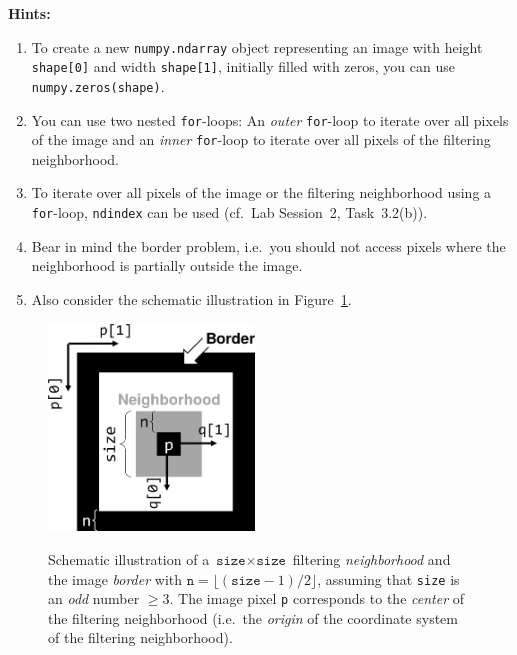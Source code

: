 \documentclass[12pt,a4paper]{article}
\begin{document}
\noindent\textbf{Hints:}
\begin{enumerate}
    \item To create a new \texttt{numpy.ndarray} object representing an image with height \texttt{shape[0]} and width \texttt{shape[1]}, initially filled with zeros, you can use \texttt{numpy.zeros(shape)}.
    \item You can use two nested \texttt{for}-loops: An \emph{outer} \texttt{for}-loop to iterate over all pixels of the image and an \emph{inner} \texttt{for}-loop to iterate over all pixels of the filtering neighborhood.
    \item To iterate over all pixels of the image or the filtering neighborhood using a \texttt{for}-loop, \texttt{ndindex} can be used (cf.\ Lab Session~2, Task~3.2(b)).
    \item Bear in mind the border problem, i.e.\ you should not access pixels where the neighborhood is partially outside the image.
    \item Also consider the schematic illustration in Figure~\ref{fig:filtering_neighborhood}.
\end{enumerate}
\begin{figure}[h!]
    \centering
    \includegraphics[height=55mm]{images/filtering-neighborhood.png}
    \label{fig:filtering_neighborhood}
    \caption{Schematic illustration of a $\texttt{size}\times\texttt{size}$ filtering \emph{neighborhood} and the image \emph{border} with $\texttt{n} = \lfloor\left(\texttt{size}-1\right) / 2\rfloor$, assuming that \texttt{size} is an \emph{odd} number $\geq 3$. The image pixel \texttt{p} corresponds to the \emph{center} of the filtering neighborhood (i.e.\ the \emph{origin} of the coordinate system of the filtering neighborhood).}
\end{figure}
\end{document}
